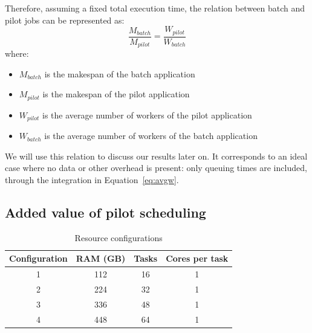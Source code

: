 	Therefore, assuming a fixed total execution time, the relation
	between batch and pilot jobs can be represented as:
	\begin{equation}
	    \frac{M_{batch}}{M_{pilot}} = \frac{W_{pilot}}{W_{batch}}\label{eq:makespancomp}
	\end{equation}
	where:
	\begin{itemize}
	    \item $M_{batch}$ is the makespan of the batch application
	    \item $M_{pilot}$ is the makespan of the pilot application
	    \item $W_{pilot}$ is the average number of workers of the pilot application
	    \item $W_{batch}$ is the average number of workers of the batch application
	\end{itemize}
	We will use this relation to discuss our results later on. It
	corresponds to an ideal case where no data or other overhead is
	present: only queuing times are included, through the integration in
	Equation~\ref{eq:avgw}.
    
	\subsection{Added value of pilot scheduling}
	    \begin{table}                                                                    
		\centering                                                                       
		\begin{tabular}{c|c|c|c}                                                             
		\rowcolor{headcolor}                                                             
		Configuration & RAM (GB) & Tasks & Cores per task\\                               
		\hline                                                                           
		1 & 112 & 16 & 1\\                                               
		2 & 224 & 32 & 1\\                                               
		3 & 336 & 48 & 1\\
		4 & 448 & 64 & 1\\
		\end{tabular}                                                                    
		\setlength{\belowcaptionskip}{-10pt}                                             
		\caption{Resource configurations}                                                    
		\label{table:dedicatednodes}                                                            
	    \end{table} 
	       
